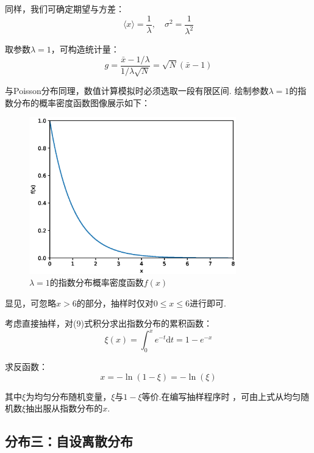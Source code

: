 \documentclass[12pt,a4paper,utf8]{ctexart}
\begin{document}
同样，我们可确定期望与方差：
\begin{equation}
    \langle x \rangle = \frac{1}{\lambda},\quad \sigma^2 = \frac{1}{\lambda^2}
\end{equation}

取参数$\lambda=1$，可构造统计量：
\begin{equation}
    g = \frac{ \bar{x} - 1/\lambda}{1/\lambda \sqrt{N}} 
    = \sqrt{N}(\bar{x} - 1)
\end{equation}

与Poisson分布同理，数值计算模拟时必须选取一段有限区间.
绘制参数$\lambda=1$的指数分布的概率密度函数图像展示如下：

\begin{figure}[t]
    \centering
    \includegraphics[width=0.8\textwidth]{fig_1.eps}
    \caption{$\lambda=1$的指数分布概率密度函数$f(x)$}
\end{figure}

显见，可忽略$x > 6$的部分，抽样时仅对$0 \leq x \leq 6$进行即可.

考虑直接抽样，对(9)式积分求出指数分布的累积函数：
\begin{equation}
    \xi(x) = \int _{0} ^{x} e^{-t} \textrm{d}t	 = 1 - e^{-x}
\end{equation}

求反函数：
\begin{equation}
    x = -\ln (1 - \xi) = -\ln(\xi)
\end{equation}

其中$\xi$为均匀分布随机变量，$\xi$与$1-\xi$等价.在编写抽样程序时
，可由上式从均匀随机数$\xi$抽出服从指数分布的$x$.
\newpage
\subsection{分布三：自设离散分布}
\end{document}
